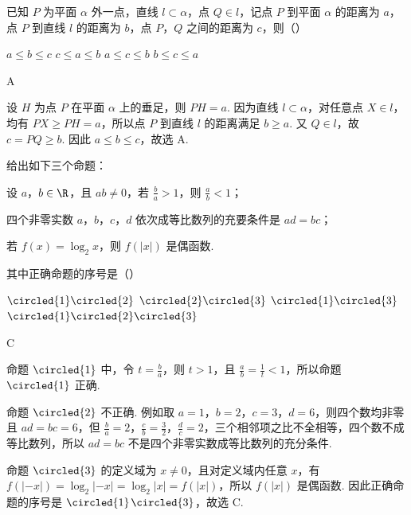 \begin{problem}
已知 \(P\) 为平面 \(\alpha\) 外一点，直线 \(l \subset \alpha\)，点 \(Q \in l\)，记点 \(P\) 到平面 \(\alpha\) 的距离为 \(a\)，点 \(P\) 到直线 \(l\) 的距离为 \(b\)，点 \(P\)，\(Q\) 之间的距离为 \(c\)，则（\quad）

\choices
    {\(a \leqslant b \leqslant c\)}
    {\(c \leqslant a \leqslant b\)}
    {\(a \leqslant c \leqslant b\)}
    {\(b \leqslant c \leqslant a\)}
\end{problem}

\begin{answer}
A
\end{answer}

\begin{solution}
设 \(H\) 为点 \(P\) 在平面 \(\alpha\) 上的垂足，则 \(PH=a\). 因为直线 \(l\subset\alpha\)，对任意点 \(X\in l\)，均有 \(PX\geqslant PH=a\)，所以点 \(P\) 到直线 \(l\) 的距离满足 \(b\geqslant a\). 又 \(Q\in l\)，故 \(c=PQ\geqslant b\). 因此 \(a\leqslant b\leqslant c\)，故选 A.
\end{solution}

\begin{problem}
给出如下三个命题：

\begin{circlelist}
\item 设 \(a\)，\(b \in \R\)，且 \(ab \neq 0\)，若 \(\frac{b}{a} > 1\)，则 \(\frac{a}{b} < 1\)；
\item 四个非零实数 \(a\)，\(b\)，\(c\)，\(d\) 依次成等比数列的充要条件是 \(ad = bc\)；
\item 若 \(f(x) = \log_2 x\)，则 \(f(|x|)\) 是偶函数.
\end{circlelist}

其中正确命题的序号是（\quad）

\choices
    {\(\circled{1}\circled{2}\)}
    {\(\circled{2}\circled{3}\)}
    {\(\circled{1}\circled{3}\)}
    {\(\circled{1}\circled{2}\circled{3}\)}
\end{problem}

\begin{answer}
C
\end{answer}

\begin{solution}
命题 \(\circled{1}\) 中，令 \(t=\frac ba\)，则 \(t>1\)，且 \(\frac ab=\frac1t<1\)，所以命题 \(\circled{1}\) 正确.

命题 \(\circled{2}\) 不正确. 例如取 \(a=1\)，\(b=2\)，\(c=3\)，\(d=6\)，则四个数均非零且 \(ad=bc=6\)，但 \(\frac ba=2\)，\(\frac cb=\frac32\)，\(\frac dc=2\)，三个相邻项之比不全相等，四个数不成等比数列，所以 \(ad=bc\) 不是四个非零实数成等比数列的充分条件.

命题 \(\circled{3}\) 的定义域为 \(x\ne0\)，且对定义域内任意 \(x\)，有 \(f(|-x|)=\log_2|-x|=\log_2|x|=f(|x|)\)，所以 \(f(|x|)\) 是偶函数. 因此正确命题的序号是 \(\circled{1}\)\(\circled{3}\)，故选 C.
\end{solution}

